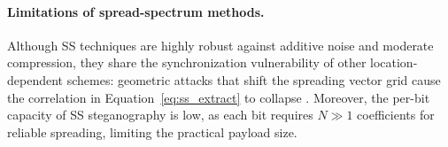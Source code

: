 \documentclass[12pt,a4paper,oneside]{report}
\begin{document}
	\paragraph{Limitations of spread-spectrum methods.}
	Although SS techniques are highly robust against additive noise and moderate compression,
	they share the synchronization vulnerability of other location-dependent schemes: geometric
	attacks that shift the spreading vector grid cause the correlation in Equation~\eqref{eq:ss_extract}
	to collapse \cite{cox2007digital}.
	Moreover, the per-bit capacity of SS steganography is low, as each bit requires $N \gg 1$
	coefficients for reliable spreading, limiting the practical payload size.
	
%	
%	
%	
%	
%	
\end{document}
